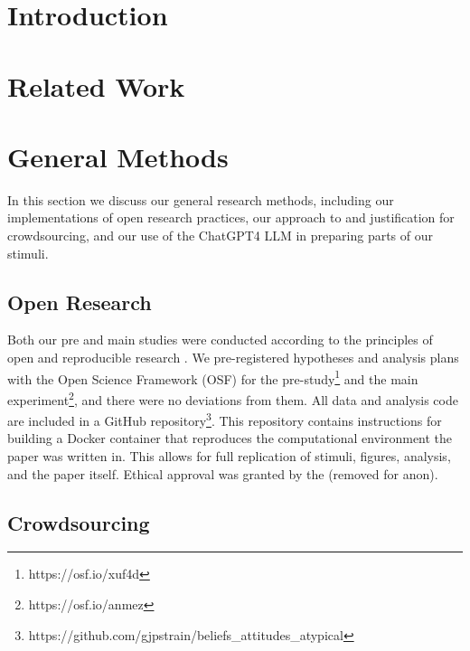 \documentclass[manuscript,screen,review]{acmart}
\begin{document}
\setlength{\parskip}{-0.1pt}

\section{Introduction}\label{sec-intro-main}

\section{Related Work}\label{sec-rel-work-main}

\section{General Methods}\label{sec-general-methods}

In this section we discuss our general research methods, including our
implementations of open research practices, our approach to and
justification for crowdsourcing, and our use of the ChatGPT4 LLM in
preparing parts of our stimuli.

\subsection{Open Research}\label{sec-open-research}

Both our pre and main studies were conducted according to the principles
of open and reproducible research \citep{ayris_2018}. We pre-registered
hypotheses and analysis plans with the Open Science Framework (OSF) for
the pre-study\footnote{https://osf.io/xuf4d} and the main
experiment\footnote{https://osf.io/anmez}, and there were no deviations
from them. All data and analysis code are included in a GitHub
repository\footnote{https://github.com/gjpstrain/beliefs\_attitudes\_atypical}.
This repository contains instructions for building a Docker container
\citep{merkel_2014} that reproduces the computational environment the
paper was written in. This allows for full replication of stimuli,
figures, analysis, and the paper itself. Ethical approval was granted by
the (removed for anon).

\subsection{Crowdsourcing}\label{crowdsourcing}
\end{document}
